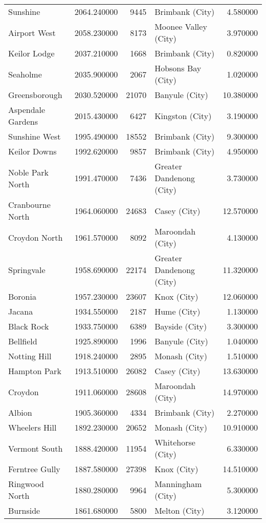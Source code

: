 \begin{table}
\begin{tabular}{lrrlr}
Sunshine & 2064.240000 & 9445 & Brimbank (City) & 4.580000 \\
Airport West & 2058.230000 & 8173 & Moonee Valley (City) & 3.970000 \\
Keilor Lodge & 2037.210000 & 1668 & Brimbank (City) & 0.820000 \\
Seaholme & 2035.900000 & 2067 & Hobsons Bay (City) & 1.020000 \\
Greensborough & 2030.520000 & 21070 & Banyule (City) & 10.380000 \\
Aspendale Gardens & 2015.430000 & 6427 & Kingston (City) & 3.190000 \\
Sunshine West & 1995.490000 & 18552 & Brimbank (City) & 9.300000 \\
Keilor Downs & 1992.620000 & 9857 & Brimbank (City) & 4.950000 \\
Noble Park North & 1991.470000 & 7436 & Greater Dandenong (City) & 3.730000 \\
Cranbourne North & 1964.060000 & 24683 & Casey (City) & 12.570000 \\
Croydon North & 1961.570000 & 8092 & Maroondah (City) & 4.130000 \\
Springvale & 1958.690000 & 22174 & Greater Dandenong (City) & 11.320000 \\
Boronia & 1957.230000 & 23607 & Knox (City) & 12.060000 \\
Jacana & 1934.550000 & 2187 & Hume (City) & 1.130000 \\
Black Rock & 1933.750000 & 6389 & Bayside (City) & 3.300000 \\
Bellfield & 1925.890000 & 1996 & Banyule (City) & 1.040000 \\
Notting Hill & 1918.240000 & 2895 & Monash (City) & 1.510000 \\
Hampton Park & 1913.510000 & 26082 & Casey (City) & 13.630000 \\
Croydon & 1911.060000 & 28608 & Maroondah (City) & 14.970000 \\
Albion & 1905.360000 & 4334 & Brimbank (City) & 2.270000 \\
Wheelers Hill & 1892.230000 & 20652 & Monash (City) & 10.910000 \\
Vermont South & 1888.420000 & 11954 & Whitehorse (City) & 6.330000 \\
Ferntree Gully & 1887.580000 & 27398 & Knox (City) & 14.510000 \\
Ringwood North & 1880.280000 & 9964 & Manningham (City) & 5.300000 \\
Burnside & 1861.680000 & 5800 & Melton (City) & 3.120000 \\

\end{tabular}
\end{table}
